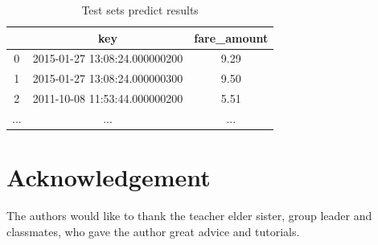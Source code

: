 \begin{table}[htbp]  
\centering
  \begin{center}
  \begin{tabular}{ccc}
\toprule
    & key & fare\_amount \\
\midrule
    0 & 2015-01-27 13:08:24.000000200 & 9.29 \\
    1 & 2015-01-27 13:08:24.000000300 & 9.50 \\
    2 & 2011-10-08 11:53:44.000000200 & 5.51 \\
    ... & ... &... \\
\bottomrule
\end{tabular}
\end{center}
\caption{Test sets predict results}
\end{table}









\newpage
\section*{Acknowledgement}



The authors would like to thank the teacher elder sister, group leader and classmates, who gave the author great advice and tutorials.

